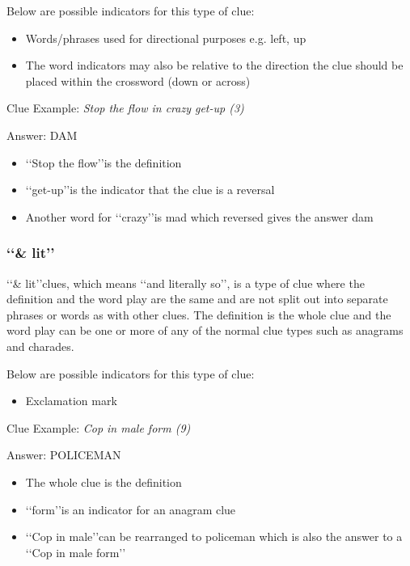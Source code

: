 Below are possible indicators for this type of clue: 
\begin{itemize}
	\item Words/phrases used for directional purposes e.g. left, up 
	\item The word indicators may also be relative to the direction the clue should be placed within the crossword (down or across) 
\\
\end{itemize}

Clue Example: \emph{Stop the flow in crazy get-up (3)}

Answer: DAM 

\begin{itemize}
	\item \lq\lq Stop the flow\rq\rq is the definition 
	\item \lq\lq get-up\rq\rq is the indicator that the clue is a reversal 
	\item Another word for \lq\lq crazy\rq\rq is mad which reversed gives the answer dam 
\end{itemize}

\subsubsection{\lq\lq \& lit\rq\rq}

\lq\lq \& lit\rq\rq clues, which means \lq\lq and literally so\rq\rq, is a type of clue where the definition and the word play are the same and are not split out into separate phrases or words as with other clues. The definition is the whole clue and the word play can be one or more of any of the normal clue types such as anagrams and charades. 

Below are possible indicators for this type of clue:
\begin{itemize} 
	\item Exclamation mark
\\
\end{itemize}

Clue Example: \emph{Cop in male form (9)}   

Answer: POLICEMAN 

\begin{itemize}
	\item The whole clue is the definition 
	\item \lq\lq form\rq\rq is an indicator for an anagram clue 
	\item \lq\lq Cop in male\rq\rq can be rearranged to policeman which is also the answer to a \lq\lq Cop in male form\rq\rq 
\end{itemize}

